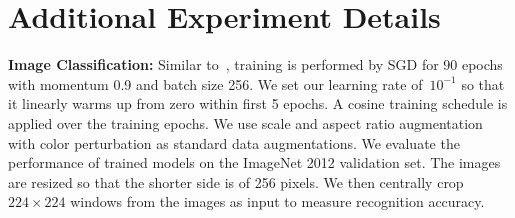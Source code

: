 \documentclass{article} \usepackage{iclr2020_conference, times}
\newcommand{\bfsection}[1]{\noindent\textbf{#1:}}
\begin{document}
\section{Additional Experiment Details}
\bfsection{Image Classification}
Similar to~\citet{goyal2017accurate,loshchilov2016sgdr}, training is
performed by SGD for 90 epochs with momentum 0.9 and batch size 256.
We set our learning rate of~$10^{-1}$ so that it linearly warms up from zero within
first 5 epochs.
A cosine training schedule is applied over the training epochs.
We use scale and aspect ratio augmentation with color perturbation as
standard data augmentations.
We evaluate the performance of trained models on the ImageNet 2012 validation
set.
The images are resized so that the shorter side is of 256 pixels.
We then centrally crop~$224 \times 224$ windows from the images as input to
measure recognition accuracy.
 
\end{document}
